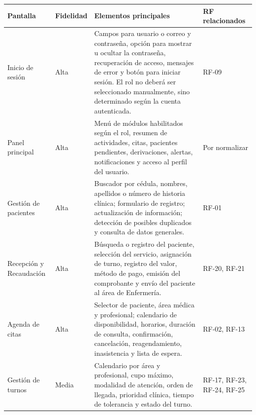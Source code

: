 \documentclass[11pt,a4paper]{article}
\begin{document}
	\begin{longtable}{p{} p{} p{} p{}}
		
		\toprule
		\textbf{Pantalla} &
		\textbf{Fidelidad} &
		\textbf{Elementos principales} &
		\textbf{RF relacionados} \\
		\midrule
		\endhead
		
		Inicio de sesión &
		Alta &
		Campos para usuario o correo y contraseña, opción para mostrar u ocultar la
		contraseña, recuperación de acceso, mensajes de error y botón para iniciar
		sesión. El rol no deberá ser seleccionado manualmente, sino determinado según
		la cuenta autenticada. &
		RF-09 \\
		
		Panel principal &
		Alta &
		Menú de módulos habilitados según el rol, resumen de actividades, citas,
		pacientes pendientes, derivaciones, alertas, notificaciones y acceso al perfil
		del usuario. &
		Por normalizar \\
		
		Gestión de pacientes &
		Alta &
		Buscador por cédula, nombres, apellidos o número de historia clínica; formulario
		de registro; actualización de información; detección de posibles duplicados y
		consulta de datos generales. &
		RF-01 \\
		
		Recepción y Recaudación &
		Alta &
		Búsqueda o registro del paciente, selección del servicio, asignación de turno,
		registro del valor, método de pago, emisión del comprobante y envío del paciente
		al área de Enfermería. &
		RF-20, RF-21 \\
		
		Agenda de citas &
		Alta &
		Selector de paciente, área médica y profesional; calendario de disponibilidad,
		horarios, duración de consulta, confirmación, cancelación, reagendamiento,
		inasistencia y lista de espera. &
		RF-02, RF-13 \\
		
		Gestión de turnos &
		Media &
		Calendario por área y profesional, cupo máximo, modalidad de atención, orden de
		llegada, prioridad clínica, tiempo de tolerancia y estado del turno. &
		RF-17, RF-23,
		RF-24, RF-25 \\
		

\end{longtable}
\end{document}
